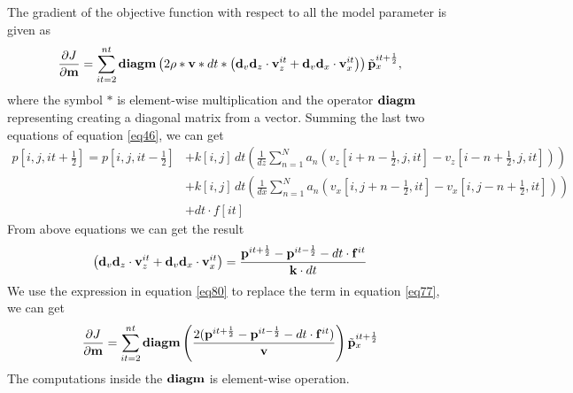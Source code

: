 \documentclass[revised,endfloat]{geophysics}
\begin{document}
The gradient of the objective function with respect to all the model parameter is given as
\begin{equation}
\frac{\partial J}{{\partial \bf m}} = \sum_{it=2}^{nt} {\bf diagm} \left( 2 {\bf \rho} \ast {\bf v} \ast dt \ast \left( {\bf d}_v{\bf d}_z \cdot {\bf v}_z^{it}+  {\bf d}_v{\bf d}_x \cdot {\bf v}_x^{it} \right)   \right) \tilde{{\bf p}}_x^{it+\frac{1}{2}} ,
\label{eq78}
\end{equation}
where the symbol $*$ is element-wise multiplication and the operator ${\bf diagm}$ representing creating a diagonal matrix from a vector.
Summing the last two equations of equation \ref{eq46},  we can get
\begin{equation}
\begin{split}
p[i,j,it+\frac{1}{2}] =  p[i,j,it-\frac{1}{2}] &+ k[i,j] \, dt \left(\frac{1}{dz} \sum_{n=1}^N  a_n \left( v_z[i+n-\frac{1}{2},j,it] - v_z[i-n+\frac{1}{2},j,it] \right)  \right) \\
&+ k[i,j]\, dt \left(\frac{1}{dx} \sum_{n=1}^N  a_n \left(v_x[i,j+n-\frac{1}{2},it] - v_x[i,j-n+\frac{1}{2},it] \right) \right) \\
&+ dt \cdot f[it]   
\end{split}
\label{eq79}
\end{equation}
From above equations we can get the result
\begin{equation}
 \left( {\bf d}_v{\bf d}_z \cdot {\bf v}_z^{it}+  {\bf d}_v{\bf d}_x \cdot {\bf v}_x^{it} \right) = 
 \frac{{\bf p}^{it+\frac{1}{2}} - {\bf p}^{it-\frac{1}{2}}  - dt \cdot {\bf f}^{it}}{{\bf k}\cdot dt}
 \label{eq80}
\end{equation}
We use the expression in equation \ref{eq80} to replace the term in equation \ref{eq77}, we can get
\begin{equation}
\frac{\partial J}{{\partial \bf m}} = \sum_{it=2}^{nt} {\bf diagm} \left( \frac{2({\bf p}^{it+\frac{1}{2}} - {\bf p}^{it-\frac{1}{2}}  - dt \cdot {\bf f}^{it})}{{\bf v}} \right) \tilde{{\bf p}}_x^{it+\frac{1}{2}} 
\label{eq81}
\end{equation}
The computations inside the ${\bf diagm}$ is element-wise operation.
\end{document}
